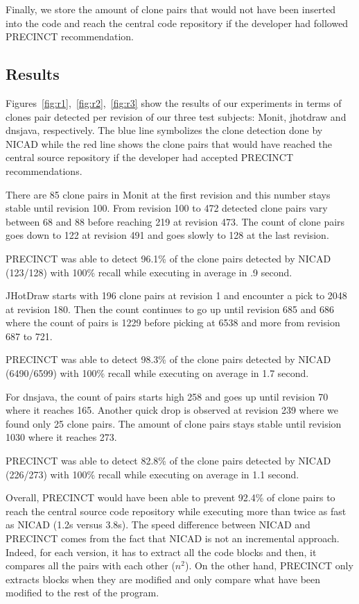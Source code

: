 \documentclass[conference]{IEEEtran}
\begin{document}
Finally, we store the amount of clone pairs that would not have been inserted into the code and reach the central code repository if the developer had followed PRECINCT recommendation.



\subsection{Results}
\label{sub:Results}

Figures~\ref{fig:r1},~\ref{fig:r2},~\ref{fig:r3} show the results of our experiments in terms of clones pair detected per revision of our three test subjects: Monit, jhotdraw and dnsjava, respectively.
The blue line symbolizes the clone detection done by NICAD while the red line shows the clone pairs that would have reached the central source repository if the developer had accepted PRECINCT recommendations.

There are 85 clone pairs in Monit at the first revision and this number stays stable until revision 100.
From revision 100 to 472 detected clone pairs vary between 68 and 88 before reaching 219 at revision 473.
The count of clone pairs goes down to 122 at revision 491 and goes slowly to 128 at the last revision.

PRECINCT was able to detect 96.1\% of the clone pairs detected by NICAD (123/128) with 100\% recall while executing in average in .9 second.

JHotDraw starts with 196 clone pairs at revision 1 and encounter a pick to 2048 at revision 180.
Then the count continues to go up until revision 685 and 686 where the count of pairs is 1229 before picking at 6538 and more from revision 687 to 721.

PRECINCT was able to detect 98.3\% of the clone pairs detected by NICAD (6490/6599) with 100\% recall while executing on average in 1.7 second.

For dnsjava, the count of pairs starts high 258 and goes up until revision 70 where it reaches 165.
Another quick drop is observed at revision 239 where we found only 25 clone pairs.
The amount of clone pairs stays stable until revision 1030 where it reaches 273.

PRECINCT was able to detect 82.8\% of the clone pairs detected by NICAD (226/273) with 100\% recall while executing on average in 1.1 second.

Overall, PRECINCT would have been able to prevent 92.4\% of clone pairs to reach the central source code repository while executing more than twice as fast as NICAD (1.2s versus 3.8s).
The speed difference between NICAD and PRECINCT comes from the fact that NICAD is not an incremental approach.
Indeed, for each version, it has to extract all the code blocks and then, it compares all the pairs with each other ($n^2$).
On the other hand, PRECINCT only extracts blocks when they are modified and only compare what have been modified to the rest of the program.
\end{document}
